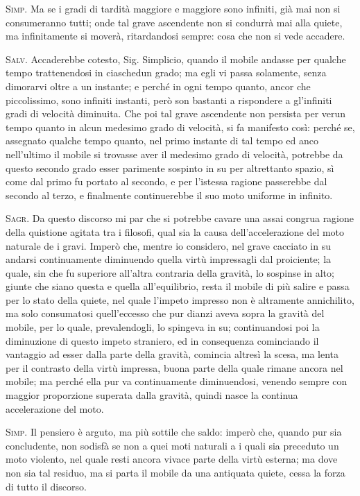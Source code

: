 \documentclass[11pt,twoside,openany]{book}
\newcommand{\speaker}[1]{\textcolor{rubric}{\textsc{#1}}\space}
\begin{document}
\speaker{Simp.} Ma se i gradi di tardità maggiore e maggiore sono infiniti, già mai non si consumeranno tutti; onde tal grave ascendente non si condurrà mai alla quiete, ma infinitamente si moverà, ritardandosi sempre: cosa che non si vede accadere.

\speaker{Salv.} Accaderebbe cotesto, Sig. Simplicio, quando il mobile andasse per qualche tempo trattenendosi in ciaschedun grado; ma egli vi passa solamente, senza dimorarvi oltre a un instante; e perché in ogni tempo quanto, ancor che piccolissimo, sono infiniti instanti, però son bastanti a rispondere a gl'infiniti gradi di velocità diminuita. Che poi tal grave ascendente non persista per verun tempo quanto in alcun medesimo grado di velocità, si fa manifesto così: perché se, assegnato qualche tempo quanto, nel primo instante di tal tempo ed anco nell'ultimo il mobile si trovasse aver il medesimo grado di velocità, potrebbe da questo secondo grado esser parimente sospinto in su per altrettanto spazio, sì come dal primo fu portato al secondo, e per l'istessa ragione passerebbe dal secondo al terzo, e finalmente continuerebbe il suo moto uniforme in infinito.

\speaker{Sagr.} Da questo discorso mi par che si potrebbe cavare una assai congrua ragione della quistione agitata tra i filosofi, qual sia la causa dell'accelerazione del moto naturale de i gravi. Imperò che, mentre io considero, nel grave cacciato in su andarsi continuamente diminuendo quella virtù impressagli dal proiciente; la quale, sin che fu superiore all'altra contraria della gravità, lo sospinse in alto; giunte che siano questa e quella all'equilibrio, resta il mobile di più salire e passa per lo stato della quiete, nel quale l'impeto impresso non è altramente annichilito, ma solo consumatosi quell'eccesso che pur dianzi aveva sopra la gravità del mobile, per lo quale, prevalendogli, lo spingeva in su; continuandosi poi la diminuzione di questo impeto straniero, ed in consequenza cominciando il vantaggio ad esser dalla parte della gravità, comincia altresì la scesa, ma lenta per il contrasto della virtù impressa, buona parte della quale rimane ancora nel mobile; ma perché ella pur va continuamente diminuendosi, venendo sempre con maggior proporzione superata dalla gravità, quindi nasce la continua accelerazione del moto.

\speaker{Simp.} Il pensiero è arguto, ma più sottile che saldo: imperò che, quando pur sia concludente, non sodisfà se non a quei moti naturali a i quali sia preceduto un moto violento, nel quale resti ancora vivace parte della virtù esterna; ma dove non sia tal residuo, ma si parta il mobile da una antiquata quiete, cessa la forza di tutto il discorso.
\end{document}
